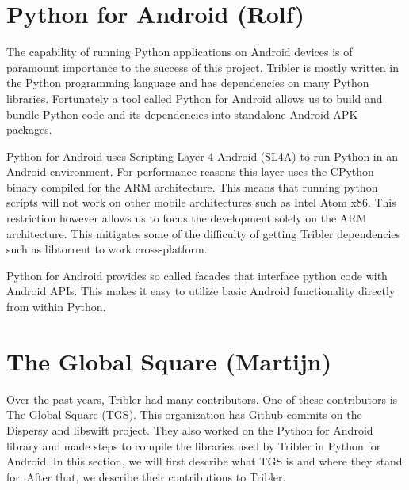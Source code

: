 \documentclass[11pt]{article}
\begin{document}
\section{Python for Android (Rolf)}
	The capability of running Python applications on Android devices is of paramount importance to the success of this project. Tribler is mostly written in the Python programming language and has dependencies on many Python libraries. Fortunately a tool called Python for Android allows us to build and bundle Python code and its dependencies into standalone Android APK packages.
	
	Python for Android uses Scripting Layer 4 Android (SL4A) to run Python in an Android environment. For performance reasons this layer uses the CPython binary compiled for the ARM architecture. This means that running python scripts will not work on other mobile architectures such as Intel Atom x86. This restriction however allows us to focus the development solely on the ARM architecture. This mitigates some of the difficulty of getting Tribler dependencies such as libtorrent to work cross-platform.
	
	Python for Android provides so called facades that interface python code with Android APIs. This makes it easy to utilize basic Android functionality directly from within Python.

\section{The Global Square (Martijn)}
Over the past years, Tribler had many contributors. One of these contributors is The Global Square (TGS). This organization has Github commits on the Dispersy and libswift project. They also worked on the Python for Android library and made steps to compile the libraries used by Tribler in Python for Android. In this section, we will first describe what TGS is and where they stand for. After that, we describe their contributions to Tribler.
\end{document}

